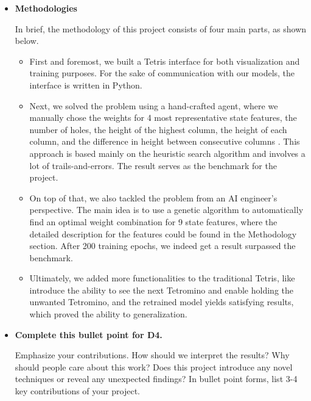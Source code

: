 \documentclass[letterpaper]{article} %
\begin{document}
\begin{itemize}
\item 
{\bf Methodologies}

In brief, the methodology of this project consists of four main parts, as shown below.
\begin{itemize}
  \item 
  First and foremost, we built a Tetris interface for both visualization and training purposes. For the sake of communication with our models, the interface is written in Python. 
  \item 
  Next, we solved the problem using a hand-crafted agent, where we manually chose the weights for 4 most representative state features, the number of holes, the height of the highest column, the height of each column, and the difference in height between consecutive columns \cite{Bertsekas_1996}. This approach is based mainly on the heuristic search algorithm and involves a lot of trails-and-errors. The result serves as the benchmark for the project.
  \item 
  On top of that, we also tackled the problem from an AI engineer's perspective. The main idea is to use a genetic algorithm to automatically find an optimal weight combination for 9 state features, where the detailed description for the features could be found in the Methodology section.  After 200 training epochs, we indeed get a result surpassed the benchmark.
  \item 
  Ultimately, we added more functionalities to the traditional Tetris, like introduce the ability to see the next Tetromino and enable holding the unwanted Tetromino, and the retrained model yields satisfying results, which proved the ability to generalization.
\end{itemize}


\item 
{\bf Complete this bullet point for D4.}

Emphasize your contributions.  How should we interpret the results?  Why should people care about this work?   Does this project introduce any novel techniques or reveal any unexpected findings?  In bullet point forms, list 3-4 key contributions of your project.

\end{itemize}
\end{document}
